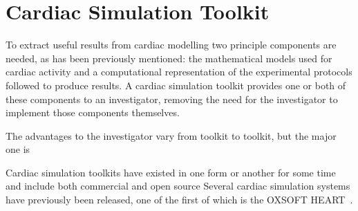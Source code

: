 \section{Cardiac Simulation Toolkit}

To extract useful results from cardiac modelling two principle components are
needed, as has been previously mentioned: the mathematical models used for
cardiac activity and a computational representation of the experimental
protocols followed to produce results.  A cardiac simulation toolkit provides
one or both of these components to an investigator, removing the need for the
investigator to implement those components themselves.

The
advantages to the investigator vary from toolkit to toolkit, but the
major one is

Cardiac simulation toolkits have existed in one form or another for some
time and include both commercial and open source 
Several cardiac simulation systems have previously been released, one of
the first of which is the OXSOFT HEART~\cite{Noble-1999}.
